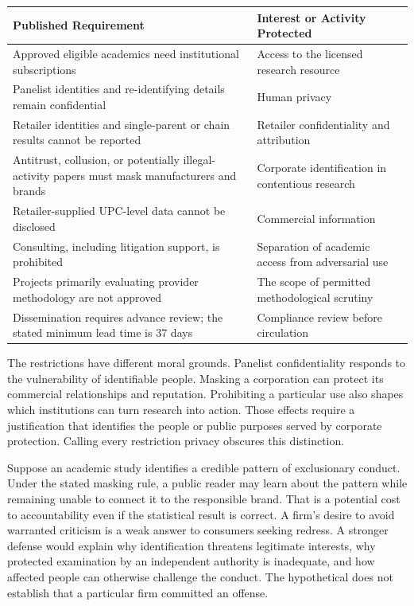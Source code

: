 \begin{table}[H]
\centering\small
\begin{tabular}{@{}
  >{\raggedright\arraybackslash}p{}
  >{\raggedright\arraybackslash}p{}@{}}
\toprule
Published Requirement & Interest or Activity Protected \\
\midrule

Approved eligible academics need institutional subscriptions & Access to
the licensed research resource \\
Panelist identities and re-identifying details remain confidential &
Human privacy \\
Retailer identities and single-parent or chain results cannot be
reported & Retailer confidentiality and attribution \\
Antitrust, collusion, or potentially illegal-activity papers must mask
manufacturers and brands & Corporate identification in contentious
research \\
Retailer-supplied UPC-level data cannot be disclosed & Commercial
information \\
Consulting, including litigation support, is prohibited & Separation of
academic access from adversarial use \\
Projects primarily evaluating provider methodology are not approved &
The scope of permitted methodological scrutiny \\
Dissemination requires advance review; the stated minimum lead time is
37 days & Compliance review before circulation \\
\bottomrule
\end{tabular}
\end{table}

The restrictions have different moral grounds. Panelist confidentiality
responds to the vulnerability of identifiable people. Masking a
corporation can protect its commercial relationships and reputation.
Prohibiting a particular use also shapes which institutions can turn
research into action. Those effects require a justification that
identifies the people or public purposes served by corporate protection.
Calling every restriction privacy obscures this distinction.

Suppose an academic study identifies a credible pattern of exclusionary
conduct. Under the stated masking rule, a public reader may learn about
the pattern while remaining unable to connect it to the responsible
brand. That is a potential cost to accountability even if the
statistical result is correct. A firm's desire to avoid warranted
criticism is a weak answer to consumers seeking redress. A stronger
defense would explain why identification threatens legitimate interests,
why protected examination by an independent authority is inadequate, and
how affected people can otherwise challenge the conduct. The
hypothetical does not establish that a particular firm committed an
offense.

